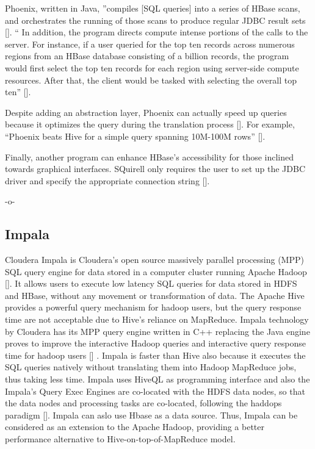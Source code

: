 Phoenix, written in Java, ''compiles [SQL queries] into a series of
HBase scans, and orchestrates the running of those scans to produce
regular JDBC result sets [\cite{www-apachephoenix-org}]. `` In addition,
the program directs compute intense portions of the calls to the
server.  For instance, if a user queried for the top ten records
across numerous regions from an HBase database consisting of a billion
records, the program would first select the top ten records for each
region using server-side compute resources.  After that, the client
would be tasked with selecting the overall top
ten'' [\cite{www-phoenix-salesforcedev}].

Despite adding an abstraction layer, Phoenix can actually speed up
queries because it optimizes the query during the translation
process [\cite{www-phoenix-cloudera}]. For example, ``Phoenix beats Hive
for a simple query spanning 10M-100M rows'' [\cite{www-phoenix-infoq}].

Finally, another program can enhance HBase's accessibility for those
inclined towards graphical interfaces.  SQuirell only requires the
user to set up the JDBC driver and specify the appropriate connection
string [\cite{www-phoenix-bighadoop}].

     -o-

\subsection{Impala}

Cloudera Impala is Cloudera's open source massively parallel
processing (MPP) SQL query engine for data stored in a computer
cluster running Apache Hadoop [\cite{www-impala-cloudera}]. It allows
users to execute low latency SQL queries for data stored in HDFS and
HBase, without any movement or transformation of data. The Apache Hive
provides a powerful query mechanism for hadoop users, but the query
response time are not acceptable due to Hive's reliance on
MapReduce. Impala technology by Cloudera has its MPP query engine
written in C++ replacing the Java engine proves to improve the
interactive Hadoop queries and interactive query response time for
hadoop users [\cite{www-impala-dummies}] . Impala is faster than Hive
also because it executes the SQL queries natively without translating
them into Hadoop MapReduce jobs, thus taking less time. Impala uses
HiveQL as programming interface and also the Impala's Query Exec
Engines are co-located with the HDFS data nodes, so that the data
nodes and processing tasks are co-located, following the haddops
paradigm [\cite{www-impala-dummies}].  Impala can aslo use Hbase as a
data source. Thus, Impala can be considered as an extension to the
Apache Hadoop, providing a better performance alternative to
Hive-on-top-of-MapReduce model.

